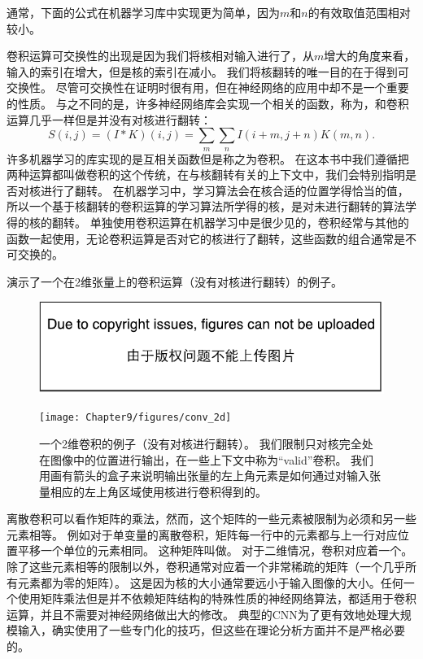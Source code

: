 通常，下面的公式在机器学习库中实现更为简单，因为$m$和$n$的有效取值范围相对较小。

 
卷积运算可交换性的出现是因为我们将核相对输入进行了，从$m$增大的角度来看，输入的索引在增大，但是核的索引在减小。
我们将核翻转的唯一目的在于得到可交换性。
尽管可交换性在证明时很有用，但在神经网络的应用中却不是一个重要的性质。
与之不同的是，许多神经网络库会实现一个相关的函数，称为，和卷积运算几乎一样但是并没有对核进行翻转：
\begin{equation}
S(i, j) = (I*K)(i, j) = \sum_m \sum_n I(i+m, j+n) K(m, n).
\end{equation}
许多机器学习的库实现的是互相关函数但是称之为卷积。
在这本书中我们遵循把两种运算都叫做卷积的这个传统，在与核翻转有关的上下文中，我们会特别指明是否对核进行了翻转。
在机器学习中，学习算法会在核合适的位置学得恰当的值， 所以一个基于核翻转的卷积运算的学习算法所学得的核，是对未进行翻转的算法学得的核的翻转。
单独使用卷积运算在机器学习中是很少见的，卷积经常与其他的函数一起使用，无论卷积运算是否对它的核进行了翻转，这些函数的组合通常是不可交换的。

演示了一个在2维张量上的卷积运算（没有对核进行翻转）的例子。
\begin{figure}[!htb]
\ifOpenSource
\centerline{\includegraphics{figure.pdf}}
\else
\centerline{\texttt{[image: Chapter9/figures/conv\_2d]}}
\fi
\caption{一个2维卷积的例子（没有对核进行翻转）。
我们限制只对核完全处在图像中的位置进行输出，在一些上下文中称为``\gls{valid}''卷积。
我们用画有箭头的盒子来说明输出张量的左上角元素是如何通过对输入张量相应的左上角区域使用核进行卷积得到的。}
\label{fig:chap9_conv_2d}
\end{figure}

离散卷积可以看作矩阵的乘法，然而，这个矩阵的一些元素被限制为必须和另一些元素相等。
例如对于单变量的离散卷积，矩阵每一行中的元素都与上一行对应位置平移一个单位的元素相同。
这种矩阵叫做。
对于二维情况，卷积对应着一个。
除了这些元素相等的限制以外，卷积通常对应着一个非常稀疏的矩阵（一个几乎所有元素都为零的矩阵）。
这是因为核的大小通常要远小于输入图像的大小。任何一个使用矩阵乘法但是并不依赖矩阵结构的特殊性质的神经网络算法，都适用于卷积运算，并且不需要对神经网络做出大的修改。
典型的\gls{CNN}为了更有效地处理大规模输入，确实使用了一些专门化的技巧，但这些在理论分析方面并不是严格必要的。

